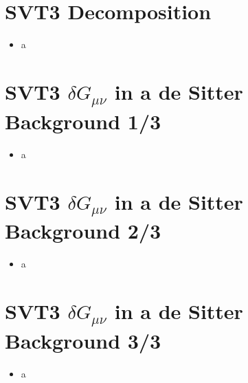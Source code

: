 \documentclass[10pt,letterpaper]{article}
\numberwithin{equation}{section}
\begin{document}

\section{SVT3 Decomposition}
\begin{itemize}
	\item a
\end{itemize}


\section{SVT3 $\delta G_{\mu\nu}$ in a de Sitter Background 1/3}
\begin{itemize}
	\item a
\end{itemize}


\section{SVT3 $\delta G_{\mu\nu}$ in a de Sitter Background 2/3}
\begin{itemize}
	\item a
\end{itemize}


\section{SVT3 $\delta G_{\mu\nu}$ in a de Sitter Background 3/3}
\begin{itemize}
	\item a
\end{itemize}

\end{document}

